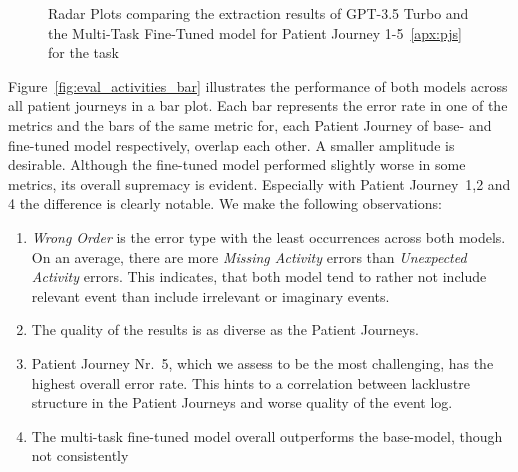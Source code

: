 \begin{figure}
  \caption{Radar Plots comparing the extraction results of GPT-3.5 Turbo and the Multi-Task Fine-Tuned model for Patient Journey 1-5~\ref{apx:pjs} for the task }
  \label{fig:eval_activities_rad}
\end{figure}
Figure~\ref{fig:eval_activities_bar} illustrates the performance of both models across all patient journeys in a bar plot. Each bar represents the error rate in one of the metrics and the bars of the same metric for, each Patient Journey of base- and fine-tuned model respectively, overlap each other. A smaller amplitude is desirable. Although the fine-tuned model performed slightly worse in some metrics, its overall supremacy is evident. Especially with Patient Journey~1,2 and 4 the difference is clearly notable.  We make the following observations:
\begin{enumerate}
    \item \emph{Wrong Order} is the error type with the least occurrences across both models. On an average, there are more \emph{Missing Activity} errors than \emph{Unexpected Activity} errors. This indicates, that both model tend to rather not include relevant event than include irrelevant or imaginary events.
    \item The quality of the results is as diverse as the Patient Journeys.
    \item Patient Journey Nr.~5, which we assess to be the most challenging, has the highest overall error rate. This hints to a correlation between lacklustre structure in the Patient Journeys and worse quality of the event log.
    \item The multi-task fine-tuned model overall outperforms the base-model, though not consistently
\end{enumerate}

